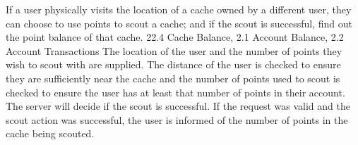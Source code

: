 {    {\footnotesize
            {If a user physically visits the location of a cache owned by a different user, they can choose to use points to scout a cache; and if the scout is successful, find out the point balance of that cache.}
            {2}{2.4 Cache Balance, 2.1 Account Balance, 2.2 Account Transactions}
            {The location of the user and the number of points they wish to scout with are supplied.}
            {The distance of the user is checked to ensure they are sufficiently near the cache and the number of points used to scout is checked to ensure the user has at least that number of points in their account. The server will decide if the scout is successful.}
            {If the request was valid and the scout action was successful, the user is informed of the number of points in the cache being scouted.}
    }
}
